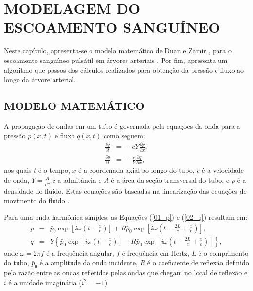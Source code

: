 \chapter{MODELAGEM DO ESCOAMENTO SANGUÍNEO}\label{sec:modelagem_escoamento}


Neste capítulo, apresenta-se o modelo matemático de Duan e Zamir \cite{Duan1992}, para o escoamento sanguíneo pulsátil em árvores arteriais . Por fim, apresenta um algoritmo que  passos dos cálculos realizados para obtenção da pressão e fluxo ao longo da árvore arterial.

\section{MODELO MATEMÁTICO}\label{sec:modelo_matematico}

A propagação de ondas em um tubo é governada pela equações da onda para a pressão $p(x,t)$ e fluxo $q(x,t)$ como seguem:
\begin{eqnarray}
	\frac{\partial q}{\partial t} &=& -cY \frac{\partial p}{\partial x},
	\label{01_p}\\
	\frac{\partial p}{\partial t} &=& -\frac{c}{Y} \frac{\partial q}{\partial x}, 
	\label{02_q}
\end{eqnarray}
nos quais $t$ é o tempo, $x$ é a coordenada axial ao longo do tubo, $c$ é a velocidade de onda, $Y = \frac{A}{\rho c}$ é a admitância e $A$ é a área da seção transversal do tubo, e $\rho$ é a densidade do fluido. Estas equações são baseadas na linearização das equações de movimento do fluido \cite{Fung,Lighthill}. 

Para uma onda harmônica simples, as Equações (\ref{01_p}) e (\ref{02_q}) resultam em:
\begin{eqnarray}
	p &=& \bar{p}_0 \exp\left[i\omega\left(t - \frac{x}{c}\right)\right] + R  \bar{p}_0 \exp\left[i\omega\left(t - \frac{2L}{c} + \frac{x}{c}\right)\right],
	\label{03_p}\\
	q &=& Y\left\{\bar{p}_0 \exp\left[i\omega\left(t - \frac{x}{c}\right)\right] -  R  \bar{p}_0 \exp\left[i\omega\left(t - \frac{2L}{c} + \frac{x}{c}\right)\right]\right\},
	\label{04_1}
\end{eqnarray}
onde $\omega = 2 \pi f$ é a frequência angular, $f$ é frequência em Hertz, $L$ é o comprimento do tubo, $\bar{p}_0$ é a amplitude da onda incidente, $R$ é o coeficiente de reflexão definido pela razão entre as ondas refletidas pelas ondas que chegam no local de reflexão \cite{Fung,Karreman} e $i$ é a unidade imaginária ($i^2 = -1$).

